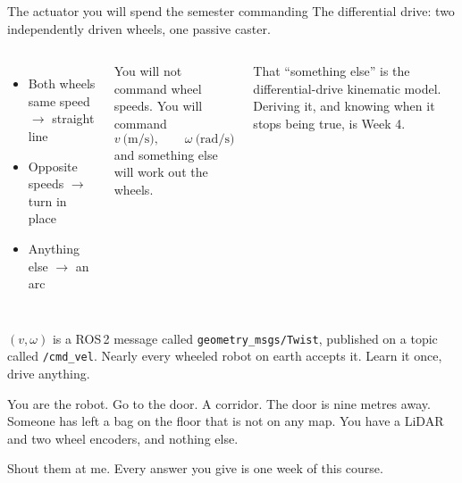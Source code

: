 \documentclass[aspectratio=169]{beamer}
\begin{document}
\begin{frame}{The actuator you will spend the semester commanding}
  \small
  The differential drive: two independently driven wheels, one passive caster.

  \vspace{0.5em}
  \begin{columns}[T,onlytextwidth]
    \begin{itemize}\footnotesize
      \item Both wheels same speed $\rightarrow$ straight line
      \item Opposite speeds $\rightarrow$ turn in place
      \item Anything else $\rightarrow$ an arc
    \end{itemize}
    \vspace{0.4em}
    You will not command wheel speeds. You will command
    \[ v \ \text{(m/s)}, \qquad \omega \ \text{(rad/s)} \]
    and something else will work out the wheels.

    \begin{underhood}
      \footnotesize
      That ``something else'' is the differential-drive kinematic model. Deriving it, and
      knowing when it stops being true, is Week 4.
    \end{underhood}
  \end{columns}

  \vspace{0.5em}
  \begin{inthefield}
    \footnotesize
    $(v,\omega)$ is a ROS\,2 message called \texttt{geometry\_msgs/Twist}, published on a
    topic called \texttt{/cmd\_vel}. Nearly every wheeled robot on earth accepts it. Learn it
    once, drive anything.
  \end{inthefield}
\end{frame}

\begin{frame}{You are the robot. Go to the door.}
  \small
  A corridor. The door is nine metres away. Someone has left a bag on the floor that is not
  on any map. You have a LiDAR and two wheel encoders, and nothing else.

  \vspace{1.0em}

  \vspace{1.0em}
  \centering
  \small Shout them at me. Every answer you give is one week of this course.
\end{frame}
\end{document}
